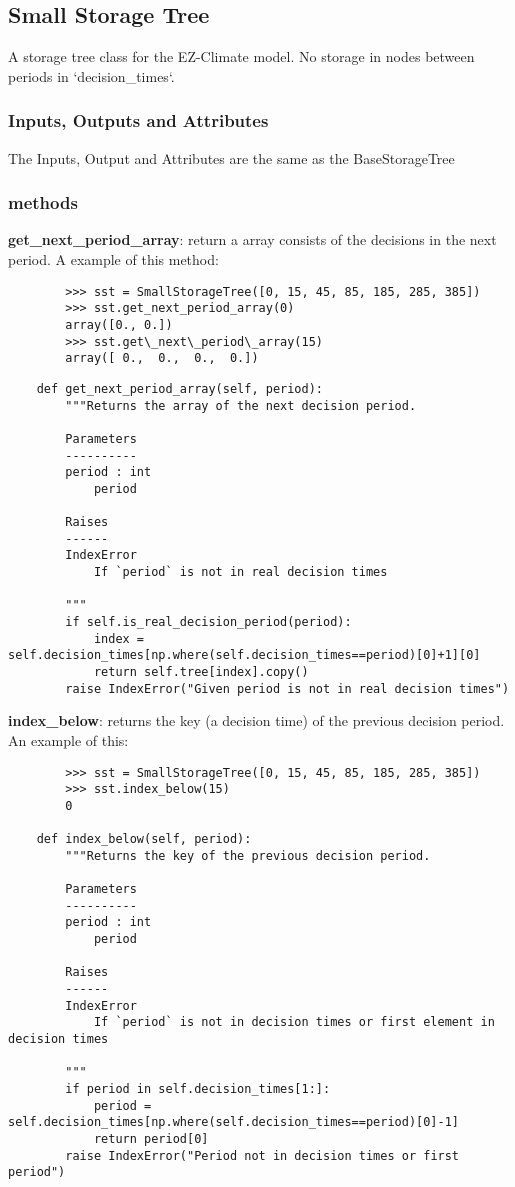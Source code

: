 \documentclass[12pt]{article}
\begin{document}
\subsection{Small Storage Tree}
A storage tree class for the EZ-Climate model. No storage in nodes between
	periods in `decision\_times`.
\subsubsection{Inputs, Outputs and Attributes}
The Inputs, Output and Attributes are the same as the BaseStorageTree
\subsubsection{methods}
\textbf{get\_next\_period\_array}: return a array consists of the decisions in the next period. A example of this method:
\begin{verbatim}
		>>> sst = SmallStorageTree([0, 15, 45, 85, 185, 285, 385])
		>>> sst.get_next_period_array(0)
		array([0., 0.])
		>>> sst.get\_next\_period\_array(15)
		array([ 0.,  0.,  0.,  0.])
\end{verbatim}
\begin{verbatim}
	def get_next_period_array(self, period):
		"""Returns the array of the next decision period.

		Parameters
		----------
		period : int
			period

		Raises
		------
		IndexError
			If `period` is not in real decision times

		"""
		if self.is_real_decision_period(period):
			index = self.decision_times[np.where(self.decision_times==period)[0]+1][0]
			return self.tree[index].copy()
		raise IndexError("Given period is not in real decision times")
\end{verbatim}
\textbf{index\_below}: returns the key (a decision time) of the previous decision period. An example of this:
\begin{verbatim}
		>>> sst = SmallStorageTree([0, 15, 45, 85, 185, 285, 385])
		>>> sst.index_below(15)
		0
		
	def index_below(self, period):
		"""Returns the key of the previous decision period.

		Parameters
		----------
		period : int
			period

		Raises
		------
		IndexError
			If `period` is not in decision times or first element in decision times

		"""
		if period in self.decision_times[1:]:
			period = self.decision_times[np.where(self.decision_times==period)[0]-1]
			return period[0]
		raise IndexError("Period not in decision times or first period")
\end{verbatim}
\end{document}
